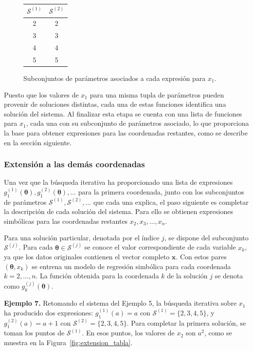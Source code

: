 \documentclass{article} \usepackage[utf8]{inputenc} \usepackage[spanish]{babel} \spanishdecimal{.} \usepackage{amsmath, amssymb, amsthm} \usepackage{bm} \usepackage{float} \usepackage{longtable} \usepackage[hidelinks]{hyperref}
\newcommand{\xvec}{\mathbf{x}} \newcommand{\thetavec}{\boldsymbol{\theta}} \newcommand{\Fvec}{\mathbf{F}} \newcommand{\R}{\mathbb{R}} \newcommand{\norm}[1]{\left\lVert#1\right\rVert} \newcommand{\loss}{\mathcal{L}} \newcommand{\dataset}{\mathcal{D}} \newcommand{\jac}{\mathbf{J}}
\begin{document}
\begin{figure}[H]
\centering
\begin{tabular}{c|c}
\(\mathcal{S}^{(1)}\) & \(\mathcal{S}^{(2)}\) \\
\hline
2 & 2 \\
3 & 3 \\
4 & 4 \\
5 & 5
\end{tabular}
\caption{Subconjuntos de parámetros asociados a cada expresión
para \(x_1\).}
\label{fig:subconjuntos_ejemplo6}
\end{figure}

Puesto que los valores de \(x_1\) para una misma tupla de parámetros
pueden provenir de soluciones distintas, cada una de estas funciones
identifica una solución del sistema. Al finalizar esta etapa se
cuenta con una lista de funciones para \(x_1\), cada una con su
subconjunto de parámetros asociado, lo que proporciona la base para
obtener expresiones para las coordenadas restantes, como se describe
en la sección siguiente.

\subsubsection{Extensión a las demás coordenadas}
\label{sec:extension_coordenadas}

Una vez que la búsqueda iterativa ha proporcionado una lista de
expresiones \(g_1^{(1)}(\thetavec), g_1^{(2)}(\thetavec), \dots\)
para la primera coordenada, junto con los subconjuntos de parámetros
\(\mathcal{S}^{(1)}, \mathcal{S}^{(2)}, \dots\) que cada una explica,
el paso siguiente es completar la descripción de cada solución del
sistema. Para ello se obtienen expresiones simbólicas para las
coordenadas restantes \(x_2, x_3, \dots, x_n\).

Para una solución particular, denotada por el índice \(j\), se dispone
del subconjunto \(\mathcal{S}^{(j)}\). Para cada
\(\thetavec \in \mathcal{S}^{(j)}\) se conoce el valor correspondiente
de cada variable \(x_k\), ya que los datos originales contienen el
vector completo \(\xvec\). Con estos pares \((\thetavec, x_k)\) se
entrena un modelo de regresión simbólica para cada coordenada
\(k = 2, \dots, n\). La función obtenida para la coordenada \(k\) de
la solución \(j\) se denota como \(g_k^{(j)}(\thetavec)\).

\bigskip
\noindent\textbf{Ejemplo 7.} Retomando el sistema del Ejemplo 5, la
búsqueda iterativa sobre \(x_1\) ha producido dos expresiones:
\(g_1^{(1)}(a) = a\) con \(\mathcal{S}^{(1)} = \{2, 3, 4, 5\}\), y
\(g_1^{(2)}(a) = a + 1\) con \(\mathcal{S}^{(2)} = \{2, 3, 4, 5\}\).
Para completar la primera solución, se toman los puntos de
\(\mathcal{S}^{(1)}\). En esos puntos, los valores de \(x_2\) son
\(a^2\), como se muestra en la Figura~\ref{fig:extension_tabla}.
\end{document}
